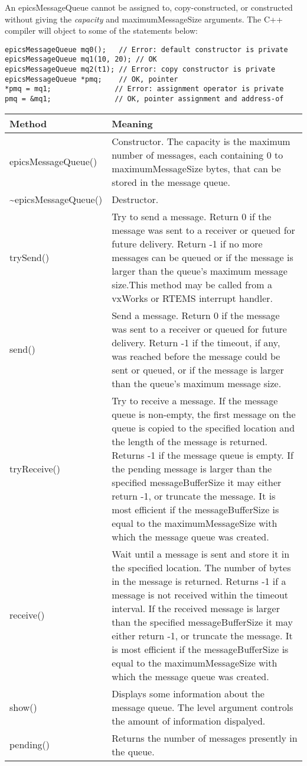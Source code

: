 An epicsMessageQueue cannot be assigned to, copy-constructed, or constructed without giving the \emph{capacity} and 
maximumMessageSize arguments. The C++ compiler will object to some of the statements below:

\begin{verbatim}
epicsMessageQueue mq0();   // Error: default constructor is private
epicsMessageQueue mq1(10, 20); // OK
epicsMessageQueue mq2(t1); // Error: copy constructor is private
epicsMessageQueue *pmq;    // OK, pointer
*pmq = mq1;               // Error: assignment operator is private
pmq = &mq1;               // OK, pointer assignment and address-of
\end{verbatim}
\begin{center}
\begin{longtable}{p{1.35in}p{5.0in}}
\textbf{Method} & \textbf{Meaning}\\
\hline
epicsMessageQueue() & Constructor. The capacity is the maximum number of messages, each containing 0 to maximumMessageSize bytes, that can be stored in the message queue.\\
\~{}epicsMessageQueue() & Destructor.\\
trySend() & Try to send a message.  Return 0 if the message was sent to a receiver or queued for future delivery.  Return -1 if no more messages can be queued or if the message is larger than the queue's maximum message size.This method may be called from a vxWorks or RTEMS interrupt handler.\\
send() & Send a message.  Return 0 if the message was sent to a receiver or queued for future delivery.  Return -1 if the timeout, if any, was reached before the message could be sent or queued, or if the message is larger than the queue's maximum message size.\\
tryReceive() & Try to receive a message.  If the message queue is non-empty, the first message on the queue is copied to the specified location and the length of the message is returned.  Returns -1 if the message queue is empty.  If the pending message is larger than the specified messageBufferSize it may either return -1, or truncate the message.  It is most efficient if the messageBufferSize is equal to the maximumMessageSize with which the message queue was created.\\
receive() & Wait until a message is sent and store it in the specified location.  The number of bytes in the message is returned.  Returns -1 if a message is not received within the timeout interval. If the received message is larger than the specified messageBufferSize it may either return -1, or truncate the message.  It is most efficient if the messageBufferSize is equal to the maximumMessageSize with which the message queue was created.\\
show() & Displays some information about the message queue.  The level argument controls the amount of information dispalyed.\\
pending() & Returns the number of messages presently in the queue.
\end{longtable}

\end{center}


